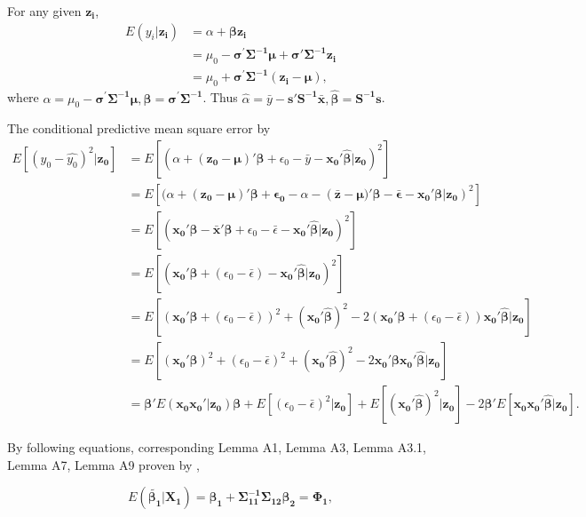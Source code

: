 For any given $\boldsymbol{z_i}$, 
$$\begin{aligned}
E(y_i|\boldsymbol{z_i})&=\alpha + \boldsymbol{\beta z_i}\\
&= \mu_{0}-\boldsymbol{\sigma^{'}\Sigma^{-1}\mu} + \boldsymbol{\sigma'\Sigma^{-1}z_i}\\
&=\mu_0+\boldsymbol{\sigma^{'}\Sigma^{-1}(z_i-\mu)},
\end{aligned}$$
where $\alpha=\mu_{0}-\boldsymbol{\sigma^{'}\Sigma^{-1}\mu}, \boldsymbol{\beta=\sigma^{'}\Sigma^{-1}}$. Thus $\hat{\alpha}=\bar{y}-\boldsymbol{s'S^{-1}\bar{x}},\boldsymbol{\hat{\beta}}=\boldsymbol{S^{-1}s}$.


The conditional predictive mean square error by 
$$\begin{aligned}
E[(y_0-\hat{y_0})^2|\boldsymbol{z_0}]
&=E[(\alpha+\boldsymbol{(z_0-\mu)'\beta}+\epsilon_0-\bar{y}-\boldsymbol{x_{0}'\hat{\beta}}|\boldsymbol{z_0})^2]\\
&=E[(\alpha+\boldsymbol{(z_0-\mu)'\beta+\epsilon_0}-\alpha-(\boldsymbol{\bar{z}-\mu)'\beta-\bar{\epsilon}-x_0'\beta|z_0})^2]\\&=E[(\boldsymbol{x_{0}'\beta}-\boldsymbol{\bar{x}'\beta}+\epsilon_0-\bar{\epsilon}-\boldsymbol{x_{0}'\hat{\beta}}|\boldsymbol{z_0})^2]\\
&=E[(\boldsymbol{x_{0}'\beta}+(\epsilon_0-\bar{\epsilon})-\boldsymbol{x_{0}'\hat{\beta}}|\boldsymbol{z_0})^2]\\
&=E[(\boldsymbol{x_0'\beta}+(\epsilon_0-\bar{\epsilon}))^2+(\boldsymbol{x_0'\hat{\beta}})^2-2(\boldsymbol{x_0'\beta}+(\epsilon_0-\bar{\epsilon}))\boldsymbol{x_0'\hat{\beta}}|\boldsymbol{z_0}]\\
&=E[(\boldsymbol{x_0'\beta})^2+(\epsilon_0-\bar{\epsilon})^2+(\boldsymbol{x_0'\hat{\beta}})^2
-2\boldsymbol{x_0'\beta x_0'\hat{\beta}}|\boldsymbol{z_0}]\\
&=\boldsymbol{\beta'}E(\boldsymbol{x_0x_0'}|\boldsymbol{z_0})\boldsymbol{\beta}+E[(\epsilon_0-\bar{\epsilon})^2|\boldsymbol{z_0}]+E[(\boldsymbol{x_0'\hat{\beta}})^2|\boldsymbol{z_0}]-2\boldsymbol{\beta'}E[\boldsymbol{x_0x_0'\hat{\beta}}|\boldsymbol{z_0}].
\end{aligned}$$

By following equations, corresponding Lemma A1, Lemma A3, Lemma A3.1, Lemma A7, Lemma A9 proven by \cite{narula1974predictive},

\begin{equation}\label{LemmaA1}
E(\boldsymbol{\tilde{\beta_1}}|\boldsymbol{X_1})=\boldsymbol{\beta_1}+\boldsymbol{\Sigma_{11}^{-1}\Sigma_{12}\beta_{2}} = \boldsymbol{\Phi_1}, 
\end{equation}

